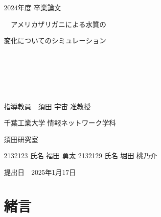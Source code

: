 \documentclass[12pt,a4j,titlepage]{ltjsarticle}
\begin{document}
\begin{titlepage}
  \begin{center}
  
    \vspace*{20truept}
    
    {\LARGE 2024年度 卒業論文} 
    
    \vspace*{75truept}
    
    {\Huge 　アメリカザリガニによる水質の
    
    変化についてのシミュレーション}　%

    \vspace{10truept}

    {\Huge }　%

    \vspace{10truept}

    {\Huge }　%

    \vspace{30truept}
    
    {\LARGE 指導教員　須田 宇宙 准教授}
    
    \vspace{60truept}
    
    {\LARGE 千葉工業大学 情報ネットワーク学科}
    
    \vspace{15truept}
    
    {\LARGE 須田研究室}
    
    \vspace{70truept}
    
    {\LARGE 2132123 氏名 福田 勇太 2132129 氏名 堀田 桃乃介  }　%

    \vspace{15truept}
  \end{center}
  \begin{flushright}
    {\LARGE 提出日　2025年1月17日}
  \end{flushright}
\end{titlepage}

\setcounter{tocdepth}{3}
\tableofcontents
\listoftables
\listoffigures
\clearpage
{}
\section{緒言}\label{緒言}
\setcounter{page}{1}
\end{document}
